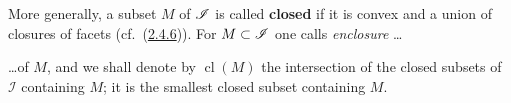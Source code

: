 \documentclass[12pt,a4paper,oneside,english]{smfart}
\makeatletter
\newcommand{\btpageanchor}[1]{\Hy@raisedlink{\hypertarget{p:#1}{}}}
\newcommand{\btref}[1]{\hyperlink{bt:#1}{#1}}
\newcommand{\btpage}[1]{\marginnote{p.~#1}\btpageanchor{#1}}
\newcommand{\pagemark}[1]{\btpage{#1}}
\theoremstyle{definition}
\theoremstyle{bt}
\makeatother
\begin{document}
\smallskip
More generally, a subset $M$ of $\Imm$ is called \textbf{closed} if it is
convex and a union of closures of facets (cf.\ (\btref{2.4.6})).  For $M\subset\Imm$
one calls \emph{enclosure} \dots
\par\endgroup

\begingroup{}
\providecommand{\Imm}{}
\renewcommand{\Imm}{\mathscr{I}}
\providecommand{\Sect}{}
\renewcommand{\Sect}{\mathfrak{C}}
\providecommand{\bA}{}
\renewcommand{\bA}{\mathbf{A}}
\providecommand{\bC}{}
\renewcommand{\bC}{\mathbf{C}}
\providecommand{\bW}{}
\renewcommand{\bW}{\mathbf{W}}
\providecommand{\bS}{}
\renewcommand{\bS}{\mathbf{S}}
\providecommand{\bT}{}
\renewcommand{\bT}{\mathbf{T}}
\providecommand{\bR}{}
\renewcommand{\bR}{\mathbf{R}}
\providecommand{\bQ}{}
\renewcommand{\bQ}{\mathbf{Q}}
\providecommand{\bN}{}
\renewcommand{\bN}{\mathbf{N}}
\providecommand{\bSig}{}
\renewcommand{\bSig}{\mathbf{\Sigma}}
\providecommand{\Par}{}
\renewcommand{\Par}{\mathscr{P}}
\providecommand{\Fac}{}
\renewcommand{\Fac}{\mathscr{F}}
\providecommand{\Bor}{}
\renewcommand{\Bor}{\mathscr{B}}
\providecommand{\Jset}{}
\renewcommand{\Jset}{\mathscr{J}}
\providecommand{\Chm}{}
\renewcommand{\Chm}{\mathscr{C}}
\providecommand{\Lch}{}
\renewcommand{\Lch}{\mathscr{L}}
\providecommand{\cl}{}
\renewcommand{\cl}{\operatorname{cl}}
\providecommand{\Stab}{}
\renewcommand{\Stab}{\operatorname{Stab}}
\providecommand{\Isom}{}
\renewcommand{\Isom}{\operatorname{Isom}}
\providecommand{\diam}{}
\renewcommand{\diam}{\operatorname{diam}}
\providecommand{\Aut}{}
\renewcommand{\Aut}{\operatorname{Aut}}
\providecommand{\Ker}{}
\renewcommand{\Ker}{\operatorname{Ker}}
\providecommand{\Card}{}
\renewcommand{\Card}{\operatorname{Card}}
\providecommand{\Ghat}{}
\renewcommand{\Ghat}{\widehat{G}}
\providecommand{\Bhat}{}
\renewcommand{\Bhat}{\widehat{B}}
\providecommand{\stmt}{}
\renewcommand{\stmt}[2]{\medskip\noindent\textit{#1}\ \textbf{(#2)}.\ ---\ }
\providecommand{\num}{}
\renewcommand{\num}[1]{\medskip\noindent\textbf{(#1)}\ }
\bigskip



\pagemark{45}
\noindent
\dots of $M$, and we shall denote by $\cl(M)$ the intersection of the closed
subsets of $\Imm$ containing $M$; it is the smallest closed subset containing
$M$.
\end{document}
